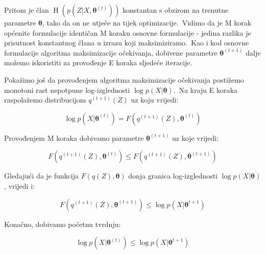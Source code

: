 \documentclass[diplomskirad]{fer}
\begin{document}
Pritom je član $\operatorname{H}(p(Z | X, \bm{\theta}^{(t)}))$ konstantan s obzirom na trenutne parametre $\bm{\theta}$, tako da on ne utječe na tijek optimizacije.\
Vidimo da je M korak općenite formulacije identičan M koraku osnovne formulacije - jedina razlika je prisutnost konstantnog člana u izrazu koji maksimiziramo.\ 
Kao i kod osnovne formulacije algoritma maksimizacije očekivanja, dobivene parametre $\bm{\theta}^{(t + 1)}$ dalje možemo iskoristiti za provođenje E koraka sljedeće iteracije.\ 


Pokažimo još da provođenjem algoritma maksimizacije očekivanja postižemo monotoni rast nepotpune log-izglednosti $\log p(X | \bm{\theta})$.\ 
Na kraju E koraka raspolažemo distribucijom $q^{(t + 1)}(Z)$ uz koju vrijedi:

\begin{equation}
  \log p(X | \bm{\theta}^{(t)}) = F(q^{(t + 1)}(Z), \bm{\theta}^{(t)})
  \label{eq:em_proof_pt1}
\end{equation}

Provođenjem M koraka dobivamo parametre $\bm{\theta}^{(t + 1)}$ uz koje vrijedi:

\begin{equation}
  F(q^{(t + 1)}(Z), \bm{\theta}^{(t)}) \leq F(q^{(t + 1)}(Z), \bm{\theta}^{(t + 1)})
  \label{eq:em_proof_pt2}
\end{equation}

Gledajući da je funkcija $F(q(Z), \bm{\theta})$ donja granica log-izglednosti $\log p(X | \bm{\theta})$, vrijedi i:

\begin{equation}
  F(q^{(t + 1)}(Z), \bm{\theta}^{(t + 1)}) \leq \log p(X | \bm{\theta}^{t + 1})
  \label{eq:em_proof_pt3}
\end{equation}

Konačno, dobivamo početnu tvrdnju:

\begin{equation}
  \log p(X | \bm{\theta}^{(t)}) \leq \log p(X | \bm{\theta}^{t + 1})
  \label{eq:em_proof_final}
\end{equation}
\end{document}
